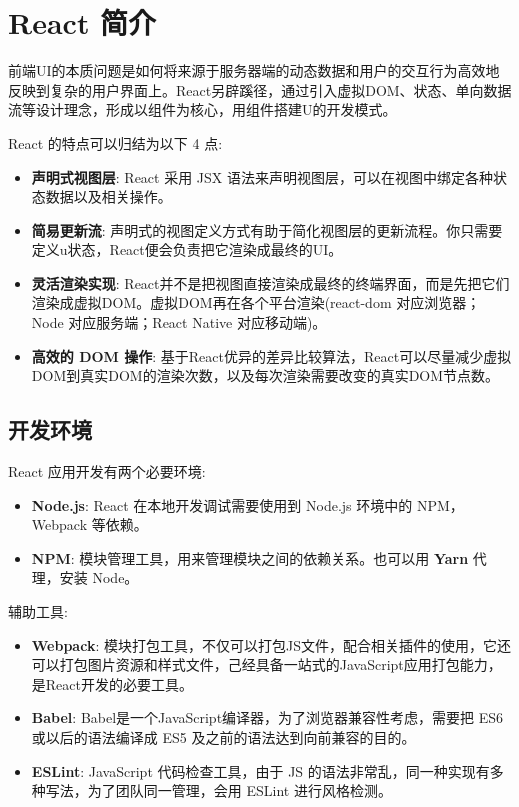 \section{React 简介}

前端UI的本质问题是如何将来源于服务器端的动态数据和用户的交互行为高效地反映到复杂的用户界面上。React另辟蹊径，通过引入虚拟DOM、状态、单向数据流等设计理念，形成以组件为核心，用组件搭建U的开发模式。

React 的特点可以归结为以下 4 点:
\begin{itemize}
    \item \textbf{声明式视图层}: React 采用 JSX 语法来声明视图层，可以在视图中绑定各种状态数据以及相关操作。
    \item \textbf{简易更新流}: 声明式的视图定义方式有助于简化视图层的更新流程。你只需要定义u状态，React便会负责把它渲染成最终的UI。
    \item \textbf{灵活渲染实现}: React并不是把视图直接渲染成最终的终端界面，而是先把它们渲染成虚拟DOM。虚拟DOM再在各个平台渲染(react-dom 对应浏览器；Node 对应服务端；React Native 对应移动端)。
    \item \textbf{高效的 DOM 操作}: 基于React优异的差异比较算法，React可以尽量减少虚拟DOM到真实DOM的渲染次数，以及每次渲染需要改变的真实DOM节点数。
\end{itemize}

\subsection{开发环境}

React 应用开发有两个必要环境:
\begin{itemize}
    \item \textbf{Node.js}: React 在本地开发调试需要使用到 Node.js 环境中的 NPM，Webpack 等依赖。
    \item \textbf{NPM}: 模块管理工具，用来管理模块之间的依赖关系。也可以用 \textbf{Yarn} 代理，安装 Node。
\end{itemize}

辅助工具:
\begin{itemize}
    \item \textbf{Webpack}: 模块打包工具，不仅可以打包JS文件，配合相关插件的使用，它还可以打包图片资源和样式文件，己经具备一站式的JavaScript应用打包能力，是React开发的必要工具。
    \item \textbf{Babel}: Babel是一个JavaScript编译器，为了浏览器兼容性考虑，需要把 ES6 或以后的语法编译成 ES5 及之前的语法达到向前兼容的目的。
    \item \textbf{ESLint}: JavaScript 代码检查工具，由于 JS 的语法非常乱，同一种实现有多种写法，为了团队同一管理，会用 ESLint 进行风格检测。
\end{itemize}


